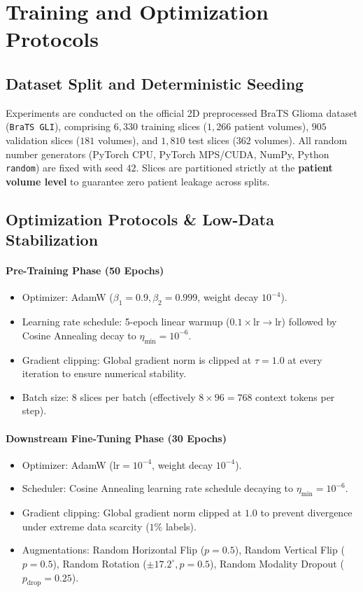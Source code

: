 \documentclass{article}
\begin{document}
\section{Training and Optimization Protocols}

\subsection{Dataset Split and Deterministic Seeding}
Experiments are conducted on the official 2D preprocessed BraTS Glioma dataset (\texttt{BraTS GLI}), comprising $6,330$ training slices ($1,266$ patient volumes), $905$ validation slices ($181$ volumes), and $1,810$ test slices ($362$ volumes). All random number generators (PyTorch CPU, PyTorch MPS/CUDA, NumPy, Python \texttt{random}) are fixed with seed $42$. Slices are partitioned strictly at the \textbf{patient volume level} to guarantee zero patient leakage across splits.

\subsection{Optimization Protocols \& Low-Data Stabilization}

\paragraph{Pre-Training Phase (50 Epochs)}
\begin{itemize}
    \item Optimizer: AdamW ($\beta_1 = 0.9, \beta_2 = 0.999$, weight decay $10^{-4}$).
    \item Learning rate schedule: 5-epoch linear warmup ($0.1 \times \text{lr} \to \text{lr}$) followed by Cosine Annealing decay to $\eta_{\text{min}} = 10^{-6}$.
    \item Gradient clipping: Global gradient norm is clipped at $\tau = 1.0$ at every iteration to ensure numerical stability.
    \item Batch size: $8$ slices per batch (effectively $8 \times 96 = 768$ context tokens per step).
\end{itemize}

\paragraph{Downstream Fine-Tuning Phase (30 Epochs)}
\begin{itemize}
    \item Optimizer: AdamW ($\text{lr} = 10^{-4}$, weight decay $10^{-4}$).
    \item Scheduler: Cosine Annealing learning rate schedule decaying to $\eta_{\text{min}} = 10^{-6}$.
    \item Gradient clipping: Global gradient norm clipped at $1.0$ to prevent divergence under extreme data scarcity ($1\%$ labels).
    \item Augmentations: Random Horizontal Flip ($p=0.5$), Random Vertical Flip ($p=0.5$), Random Rotation ($\pm 17.2^\circ, p=0.5$), Random Modality Dropout ($p_{\text{drop}} = 0.25$).
\end{itemize}
\end{document}
